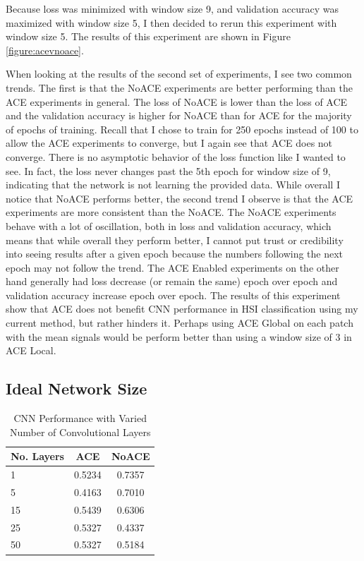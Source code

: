 \documentclass[12pt]{article}
\begin{document}
Because loss was minimized with window size 9, and validation accuracy was maximized with window size 5, I then decided to rerun this experiment with window size 5.
%
The results of this experiment are shown in Figure \ref{figure:acevnoace}.

When looking at the results of the second set of experiments, I see two common trends.
%
The first is that the NoACE experiments are better performing than the ACE experiments in general.
%
The loss of NoACE is lower than the loss of ACE and the validation accuracy is higher for NoACE than for ACE for the majority of epochs of training.
%
Recall that I chose to train for 250 epochs instead of 100 to allow the ACE experiments to converge, but I again see that ACE does not converge.
%
There is no asymptotic behavior of the loss function like I wanted to see.
%
In fact, the loss never changes past the 5th epoch for window size of 9, indicating that the network is not learning the provided data.
%
While overall I notice that NoACE performs better, the second trend I observe is that the ACE experiments are more consistent than the NoACE.
%
The NoACE experiments behave with a lot of oscillation, both in loss and validation accuracy, which means that while overall they perform better, I cannot put trust or credibility into seeing results after a given epoch because the numbers following the next epoch may not follow the trend.
%
The ACE Enabled experiments on the other hand generally had loss decrease (or remain the same) epoch over epoch and validation accuracy increase epoch over epoch. 
%
The results of this experiment show that ACE does not benefit CNN performance in HSI classification using my current method, but rather hinders it.
%
Perhaps using ACE Global on each patch with the mean signals would be perform better than using a window size of 3 in ACE Local.

\subsection{Ideal Network Size}

\begin{table}[t]
	
	\centering
	
	\caption{CNN Performance with Varied Number of Convolutional Layers}
	\label{table:cnn}
	\begin{tabular}{l | c | c }
		\textbf{No. Layers} & \textbf{ACE} & \textbf{NoACE} \\			
		\hline	
		1 & 0.5234 & 0.7357 \\
		5 & 0.4163 & 0.7010 \\
		15 & 0.5439 & 0.6306 \\
		25 & 0.5327 & 0.4337 \\
		50 & 0.5327 & 0.5184 \\
		
	\end{tabular}	
	
\end{table}
\end{document}
